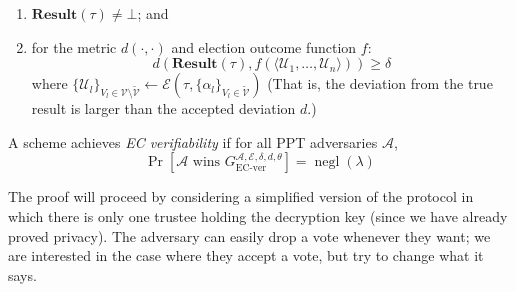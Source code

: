 \documentclass[12pt,a4paper]{article}
\DeclareMathOperator{\negl}{\text{negl}}
\theoremstyle{definition}
\begin{document}
\begin{definition}[EC Verifiability]
\begin{enumerate}
        \item $\mathbf{Result}(\tau) \neq \bot$; and
        \item for the metric $d(\cdot, \cdot)$ and election outcome function $f$:
                    $$d(\mathbf{Result}(\tau), f(\langle\mathcal{U}_1,\ldots,\mathcal{U}_n\rangle)) \geq \delta$$
            where $\{\mathcal{U}_l\}_{V_l \in \mathcal{V} \setminus \tilde{\mathcal{V}}} \leftarrow \mathcal{E}(\tau, \{\alpha_l \}_{V_l \in \tilde{\mathcal{V}}})$
            (That is, the deviation from the true result is larger than the accepted deviation $d$.)
    \end{enumerate}
    A scheme achieves \textit{EC verifiability} if for all PPT adversaries $\mathcal{A}$, $$\Pr\left[\mathcal{A}\text{ wins }G_\text{EC-ver}^{\mathcal{A},\mathcal{E},\delta,d,\theta}\right]=\negl(\lambda)$$
\end{definition}

The proof will proceed by considering a simplified version of the protocol in which there is only one trustee holding the decryption key (since we have already proved privacy). The adversary can easily drop a vote whenever they want; we are interested in the case where they accept a vote, but try to change what it says.
\end{document}
